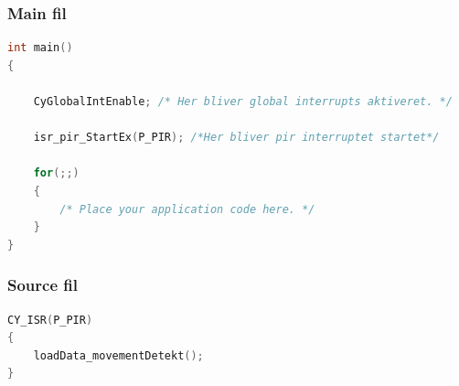 \subsubsection*{Main fil}
\begin{lstlisting}[language=C]
int main()
{

    CyGlobalIntEnable; /* Her bliver global interrupts aktiveret. */
    
    isr_pir_StartEx(P_PIR); /*Her bliver pir interruptet startet*/
    
    for(;;)
    {
        /* Place your application code here. */
    }
}
\end{lstlisting}


\subsubsection*{Source fil}
\begin{lstlisting}[language=C]
CY_ISR(P_PIR)
{  
    loadData_movementDetekt();   
}
\end{lstlisting}